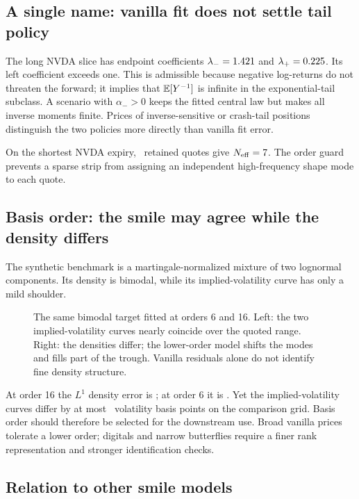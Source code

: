\subsection{A single name: vanilla fit does not settle tail policy}

The long NVDA slice has endpoint coefficients
$\lambda_-=1.421$ and $\lambda_+=0.225$.  Its left coefficient
exceeds one.  This is admissible because negative log-returns do not threaten
the forward; it implies that $\mathbb{E}[Y^{-1}]$ is infinite in the exponential-tail
subclass.  A scenario with $\alpha_->0$ keeps the fitted central law but makes
all inverse moments finite.  Prices of inverse-sensitive or crash-tail
positions distinguish the two policies more directly than vanilla fit error.

On the shortest NVDA expiry, \MacGuardQuoteCountZeroDte\ retained quotes give
$N_{\rm eff}=7$.  The order guard prevents a sparse
strip from assigning an independent high-frequency shape mode to each quote.

\subsection{Basis order: the smile may agree while the density differs}

The synthetic benchmark is a martingale-normalized mixture of two lognormal
components.  Its density is bimodal, while its implied-volatility curve has
only a mild shoulder.

\begin{figure}[htbp]
\centering
{}
\caption{The same bimodal target fitted at orders 6 and 16.  Left: the two
implied-volatility curves nearly coincide over the quoted range.  Right: the
densities differ; the lower-order model shifts the modes and fills part of the
trough.  Vanilla residuals alone do not identify fine density structure.}
\label{fig:order_control}
\end{figure}

At order 16 the $L^1$ density error is \MacHumpLOneNSixteen; at order 6 it is
\MacHumpLOneNSix.  Yet the implied-volatility curves differ by at most
\MacHumpIvAgreeBp\ volatility basis points on the comparison grid.  Basis
order should therefore be selected for the downstream use.  Broad vanilla
prices tolerate a lower order; digitals and narrow butterflies require a
finer rank representation and stronger identification checks.

\subsection{Relation to other smile models}

